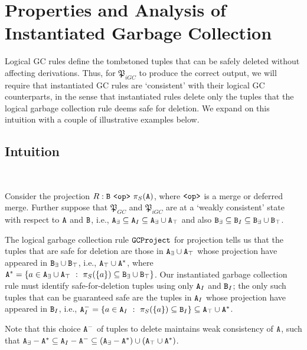 
\section{Properties and Analysis of Instantiated Garbage Collection}
\label{sec:instantiated}



\setcounter{subsection}{-1}
Logical GC rules define the tombstoned tuples that can be safely deleted without affecting derivations.
Thus, for $\mathfrak{P}_{iGC}$ to produce the correct output, we will require that instantiated GC rules are `consistent' with their logical GC counterparts, in the sense that instantiated rules delete only the tuples that the logical garbage collection rule deems safe for deletion.
We expand on this intuition with a couple of illustrative examples below.

\subsection{Intuition}
\begin{example}~

Consider the projection $R: \tt{B} ~\tt{<op>}~ \pi_S(\tt{A})$, where $\tt{<op>}$ is a merge or deferred merge.
Further suppose that $\mathfrak{P}_{GC}$ and $\mathfrak{P}_{iGC}$ are at a `weakly consistent' state with respect to $\tt{A}$ and $\tt{B}$, i.e.,
$\tt{A}_\exists \subseteq \tt{A}_I \subseteq \tt{A}_\exists \cup \tt{A}_\top$ and also
$\tt{B}_\exists \subseteq \tt{B}_I \subseteq \tt{B}_\exists \cup \tt{B}_\top$.

The logical garbage collection rule $\tt{GCProject}$ for projection tells us that the  tuples that are safe for deletion are those in $\tt{A}_\exists \cup \tt{A}_\top$ whose projection have appeared in $\tt{B}_\exists \cup \tt{B}_\top$, i.e., $\tt{A}_\top \cup \tt{A}^*$, where $\tt{A}^* = \{a \in \tt{A}_\exists \cup \tt{A}_\top ~:~ \pi_S(\{a\}) \subseteq \tt{B}_\exists \cup \tt{B}_\top\}$.
Our instantiated garbage collection rule must identify safe-for-deletion tuples using only $\tt{A}_I$ and $\tt{B}_I$; the only such tuples that can be guaranteed safe are the tuples in $\tt{A}_I$ whose projection have appeared in $\tt{B}_I$, i.e., $\tt{A}_I^- = \{a \in \tt{A}_I ~:~ \pi_S(\{a\}) \subseteq \tt{B}_I\} \subseteq \tt{A}_\top \cup \tt{A}^*$.

Note that this choice $\tt{A}^-$ of tuples to delete maintains weak consistency of $\tt{A}$, such that $\tt{A}_\exists - \tt{A}^* \subseteq \tt{A}_I - \tt{A}^- \subseteq (\tt{A}_\exists - \tt{A}^*) \cup (\tt{A}_\top \cup \tt{A}^*)$.
\end{example}

